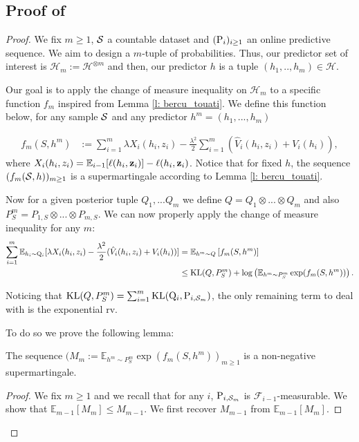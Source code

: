 \subsection{Proof of }
\label{sec: proof_main_thm_online-ht}
 \begin{proof}
   We fix $m\geq 1$, $\S$ a countable dataset and $(\P_{i})_{i\geq 1}$ an online predictive sequence. We aim to design a $m$-tuple of probabilities. Thus, our predictor set of interest is $\mathcal{H}_m:= \mathcal{H}^{\otimes m}$ and then, our predictor $h$ is a tuple $(h_1,..,h_m)\in\mathcal{H}$.

   Our goal is to apply the change of measure inequality on $\mathcal{H}_m$ to a specific function $f_m$ inspired from Lemma \ref{l: bercu_touati}. We define this function below, for any sample $\S$ and any predictor $h^m=(h_1,...,h_m)$

   \begin{align*}
   f_m(S,h^m) & := \sum_{i=1}^m \lambda X_i(h_i,z_i)  - \frac{\lambda^2}{2}\sum_{i=1}^m(\hat{V}_i(h_i,z_i) + V_i(h_i)),
   \end{align*}
   where $X_i(h_i,z_i)= \mathbb{E}_{i-1}[\ell(h_i,\z_i)]- \ell(h_i,\z_i)$. Notice that for fixed $h$, the sequence $(f_m(\S,h))_{m\geq 1}$ is a supermartingale according to Lemma \ref{l: bercu_touati}.

   Now for a given posterior tuple $Q_1,...Q_m$ we define $Q= Q_1 \otimes ...\otimes Q_m$ and also $P^m_S = P_{1,S}\otimes...\otimes P_{m,S}$. We can now properly apply the change of measure inequality for any $m$:
   \begin{align*}
    \sum_{i=1}^m \mathbb{E}_{h_i\sim \Q_{i}}[\lambda X_i(h_i,z_i)  - \frac{\lambda^2}{2}(\hat{V}_i(h_i,z_i) + V_i(h_i))] & = \mathbb{E}_{h^m\sim Q}\left[ f_m(S,h^m) \right] \\
    & \leq \operatorname{KL}(Q,P^m_S) + \log \left( \mathbb{E}_{h^m\sim P^m_S}\exp(f_m(S,h^m))  \right).
   \end{align*}

   Noticing that $\operatorname{KL}(Q,P^m_S)= \sum_{i=1}^m \operatorname{KL}(\Q_{i},\P_{i,\Sm})$, the only remaining term to deal with is the exponential rv.

   To do so we prove the following lemma:

   \begin{lemma}
     The sequence $(M_m:=\mathbb{E}_{h^m\sim P^m_S}\exp(f_m(S,h^m))_{m\geq 1}$ is a non-negative supermartingale.
   \end{lemma}
   \begin{proof}
   We fix $m\geq 1$ and we recall that for any $i$, $\P_{i,\Sm}$ is $\mathcal{F}_{i-1}$-measurable. We show that $\mathbb{E}_{m-1}[M_m] \leq M_{m-1}$. We first recover $M_{m-1}$ from $\mathbb{E}_{m-1}[M_m]$.


\end{proof}
\end{proof}

